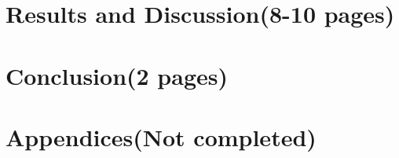 \documentclass[12pt, openany]{book}
\begin{document}
\chapter{Results and Discussion(8-10 pages)}



\chapter{Conclusion(2 pages)}


\clearpage %


\newpage
\chapter{Appendices(Not completed)}
\begin{appendices}
\end{appendices}
\end{document}
